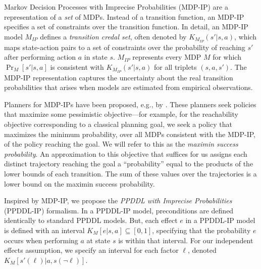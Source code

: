 \documentclass[letterpaper]{article} %
\newcommand{\ip}{\textit{IP}}
\begin{document}
Markov Decision Processes with Imprecise Probabilities (MDP-IP) \cite{satia1973markovian}
are a representation of a \emph{set} of MDPs. 
Instead of a transition function, an MDP-IP specifies a set of constraints over the transition function. 
In detail, an MDP-IP model $M_{\ip}$ defines a \emph{transition credal set}, often denoted by $K_{M_{\ip}}(s'|s,a)$, which maps state-action pairs to a set of constraints over the probability of reaching $s'$ after performing action $a$ in state $s$. 
$M_{\ip}$ represents every MDP $M$ for which $\Pr_{M}[s'|s,a]$ is consistent with $K_{M_{\ip}}(s'|s,a)$ for all triplets $(s,a,s')$. %
The MDP-IP representation captures the uncertainty about the real transition probabilities that arises when models are estimated from empirical observations.

Planners for MDP-IPs have been proposed, e.g., by \citet{delgado2011efficient}. These planners seek policies that maximize some pessimistic objective---for example, for the reachability objective corresponding to a classical planning goal, we seek a policy that maximizes the minimum probability, over all MDPs consistent with the MDP-IP, of the policy reaching the goal. 
We will refer to this as the \emph{maximin success probability}. 
An approximation to this objective that suffices for us assigns each distinct trajectory reaching the goal a ``probability'' equal to the products of the lower bounds of each transition. The sum of these values over the trajectories is a lower bound on the maximin success probability.

Inspired by MDP-IP, we propose the \emph{PPDDL with Imprecise Probabilities} (PPDDL-IP) formalism. 
In a PPDDL-IP model, preconditions are defined identically to standard PPDDL models. 
But, each effect $e$ in a PPDDL-IP model is defined with an interval $K_M[e|s,a]\subseteq [0,1]$, specifying that the probability $e$ occurs when performing $a$ at state $s$ is within that interval. 
For our independent effects assumption, we specify an interval for each factor $\ell$, denoted $K_M[s'(\ell)|a,s(\neg \ell)]$.  
\end{document}
